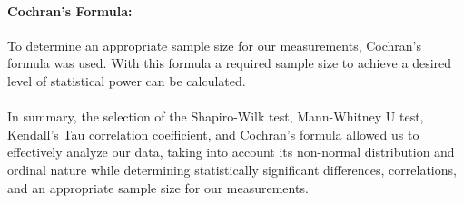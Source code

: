 \paragraph{Cochran's Formula:}
To determine an appropriate sample size for our measurements, Cochran's formula was used. With this formula a required sample size to achieve a desired level of statistical power can be calculated.\cite{Cochran}

\paragraph{}
In summary, the selection of the Shapiro-Wilk test, Mann-Whitney U test, Kendall's Tau correlation coefficient, and Cochran's formula allowed us to effectively analyze our data, taking into account its non-normal distribution and ordinal nature while determining statistically significant differences, correlations, and an appropriate sample size for our measurements.
